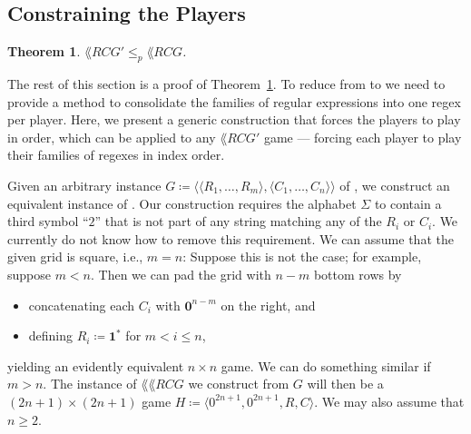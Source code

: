\documentclass{article}
\newcommand{\0}{\mathbf{0}}
\newcommand{\1}{\mathbf{1}}
\newcommand{\2}{\mathbf{2}}
\newcommand{\RCG}{\lang{RCG}}
\newcommand{\tup}[1]{\langle{} #1 \rangle{}}
\newcommand{\reducp}[2]{{{#1} \le_p {#2}}}
\newcounter{row}
\newcounter{col}
\theoremstyle{plain}
\newtheorem{theorem}{Theorem}
\theoremstyle{definition}
\begin{document}
\subsection{Constraining the Players}
\begin{theorem}\label{thm:constant-regexes}
  $\reducp{\lang{RCG'}}{\lang{RCG}}$.
\end{theorem}
The rest of this section is a proof of Theorem~\ref{thm:constant-regexes}. To reduce from   to  we need to provide a method to consolidate the families of regular expressions into one regex per player. Here, we present a generic construction that forces the players to play in order, which can be applied to any $\lang{RCG'}$ game --- forcing each player to play their families of regexes in index order.

Given an arbitrary instance $G \coloneqq \tup{\tup{R_1,\ldots,R_m},\tup{C_1,\ldots,C_n}}$ of , we construct an equivalent instance of .  Our construction requires the alphabet $\Sigma$ to contain a third symbol ``$2$'' that is not part of any string matching any of the $R_i$ or $C_i$.  We currently do not know how to remove this requirement.  We can assume that the given  grid is square, i.e., $m=n$:  Suppose this is not the case; for example, suppose $m < n$.  Then we can pad the grid with $n-m$ bottom rows by
\begin{itemize}
  \item
        concatenating each $C_i$ with $\0^{n-m}$ on the right, and
  \item
        defining $R_i \coloneqq \1^*$ for $m < i \le n$,
\end{itemize}
yielding an evidently equivalent $n\times n$ game.  We can do something similar if $m > n$.  The instance of $\lang{\RCG}$ we construct from $G$ will then be a $(2n+1)\times(2n+1)$ game $H \coloneqq\tup{0^{2n+1},0^{2n+1},R,C}$.  We may also assume that $n\ge 2$.
\end{document}
